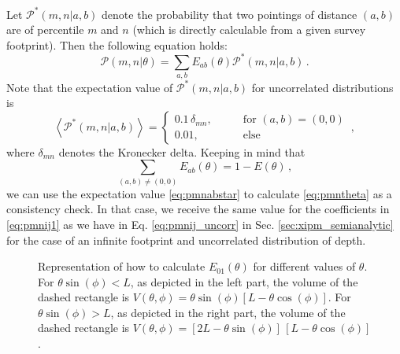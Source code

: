 \documentclass{aa}
\def\la{\left<}
\def\ra{\right>}
\begin{document}
\begin{appendix}
Let $\mathcal{P}^*(m,n|a,b)$ denote the probability that two pointings of distance $(a,b)$ are of percentile $m$ and $n$ (which is directly calculable from a given survey footprint). 
Then the following equation holds: \begin{equation}
\mathcal{P}(m,n|\theta) = \sum_{a,b} E_{ab}(\theta)\mathcal{P}^*(m,n|a,b)\, .
\label{eq:pmntheta}
\end{equation}
Note that the expectation value of $\mathcal{P}^*(m,n|a,b)$ for uncorrelated distributions is \begin{equation}
\la \mathcal{P}^*(m,n|a,b)\ra = \begin{cases}
0.1\,\delta_{mn},\qquad & \text{for }(a,b)=(0,0) \\
0.01, & \text{else}
\end{cases}\, ,
\label{eq:pmnabstar}
\end{equation}
where $\delta_{mn}$ denotes the Kronecker delta. Keeping in mind that \begin{equation}
\sum_{(a,b)\neq (0,0)} E_{ab}(\theta) = 1-E(\theta)\, ,
\end{equation}
we can use the expectation value \eqref{eq:pmnabstar} to calculate \eqref{eq:pmntheta} as a consistency check. In that case, we receive the same value for the coefficients in \eqref{eq:pmnij1} as we have in Eq. \eqref{eq:pmnij_uncorr} in Sec. \ref{sec:xipm_semianalytic} for the case of an infinite footprint and uncorrelated distribution of depth.

\begin{figure}
\centering
\sidecaption
\begin{subfigure}[c]{6cm}
\def\svgwidth{100pt}
\hspace*{1cm}

\end{subfigure}
\begin{subfigure}[c]{6cm}
\def\svgwidth{100pt}
\hspace*{1cm}

\end{subfigure}
\caption[How to calculate $E_{01}(\theta)$]{Representation of how to calculate $E_{01}(\theta)$ for different values of $\theta$. For $\theta\sin(\phi)<L$, as depicted in the left part, the volume of the dashed rectangle is $V(\theta,\phi)=\theta\sin(\phi)[L-\theta\cos(\phi)]$. For $\theta\sin(\phi)>L$, as depicted in the right part, the volume of the dashed rectangle is $V(\theta,\phi)=[2L-\theta\sin(\phi)]\, [L-\theta\cos(\phi)]$.}
\label{fig:e01theta}
\end{figure}


\end{appendix}
\end{document}
